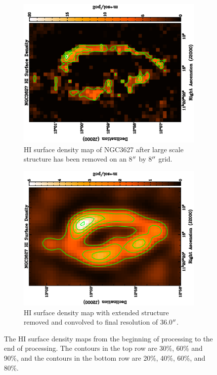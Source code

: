 \begin{figure}
  \begin{subfigure}[t]{.45\textwidth}
    \centering
    \includegraphics[width=1.\textwidth,angle=270]{obs_imgs/HI_rem.eps}
    \caption{HI surface density map of NGC3627 after large scale structure has been removed on an 8$\mbox{$^{\prime\prime}$}$ by 8$\mbox{$^{\prime\prime}$}$ grid.}
  \end{subfigure}%
  \quad
  \begin{subfigure}[t]{0.45\textwidth}
    \centering
    \includegraphics[width=1.\textwidth,angle=270]{obs_imgs/HI_use.eps}
    \caption[100$\mu$m Filtering Steps]{HI surface density map with extended structure removed and convolved to final resolution of 36.0$\mbox{$^{\prime\prime}$}$.}
  \end{subfigure}
  \caption[HI surface density filtering Steps]{The HI surface density maps from the beginning of processing to the end of processing.  The contours in the top row are 30\%, 60\% and 90\%, and the contours in the bottom row are 20\%, 40\%, 60\%, and 80\%.}
  \label{fig_HI_transform}
\end{figure}
 
